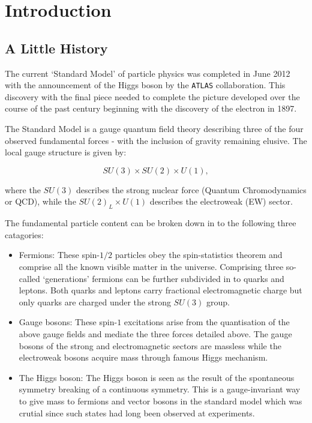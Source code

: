\chapter{Introduction}
\label{chap:intro}

\section{A Little History}
\label{sec:history}

	The current `Standard Model' of particle physics was completed in June 2012 with the announcement of the Higgs boson by the \texttt{ATLAS} collaboration.
	This discovery with the final piece needed to complete the picture developed over the course of the past century beginning with the discovery of the electron in 1897.

	The Standard Model is a gauge quantum field theory describing three of the four observed fundamental forces - with the inclusion of gravity remaining elusive.
	The local gauge structure is given by:

	\begin{equation}
		SU(3)\times SU(2)\times U(1),
		\label{eq:SMGauge}
	\end{equation}

	where the $SU(3)$ describes the strong nuclear force (Quantum Chromodynamics or QCD), while the $SU(2)_L\times U(1)$ describes the electroweak (EW) sector.

	The fundamental particle content can be broken down in to the following three catagories:

	\begin{itemize}
		\item Fermions: These spin-$1/2$ particles obey the spin-statistics theorem and comprise all the known visible matter in the universe.
		Comprising three so-called `generations' fermions can be further subdivided in to quarks and leptons.  Both quarks and leptons
		carry fractional electromagnetic charge but only quarks are charged under the strong $SU(3)$ group.
		\item Gauge bosons: These spin-$1$ excitations arise from the quantisation of the above gauge fields and mediate the three forces detailed above.
		The gauge bosons of the strong and electromagnetic sectors are massless while the electroweak bosons acquire mass through famous Higgs mechanism.
		\item The Higgs boson: The Higgs boson is seen as the result of the spontaneous symmetry breaking of a continuous symmetry.
		This is a gauge-invariant way to give mass to fermions and vector bosons in the standard model which was crutial since such states had long been
		observed at experiments.
	\end{itemize}

